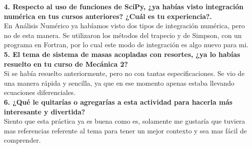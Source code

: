 \documentclass[12pt]{article}
\begin{document}
\noindent\textbf {4. Respecto al uso de funciones de SciPy, ¿ya habías visto integración numérica en tus cursos anteriores? ¿Cuál es tu experiencia?.} \\

En Análisis Numérico ya habíamos visto dos tipos de integración numérica, pero no de esta manera. Se utilizaron los métodos del trapecio y de Simpson, con un programa en Fortran, por lo cual este modo de integración es algo nuevo para mi. \\

\noindent\textbf {5. El tema de sistema de masas acopladas con resortes, ¿ya lo habías resuelto en tu curso de Mecánica 2?}\\

Si se había resuelto anteriormente, pero no con tantas especificaciones. Se vio de una manera rápida y sencilla, ya que en ese momento apenas estaba llevando ecuaciones diferenciales. \\

\noindent\textbf {6. ¿Qué le quitarías o agregarías a esta actividad para hacerla más interesante y divertida? }\\

Siento que esta práctica ya es buena como es, solamente me gustaría que tuviera mas referencias referente al tema para tener un mejor contexto y sea mas fácil de comprender.
\end{document}
